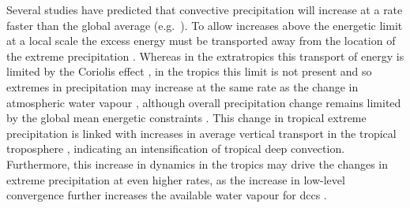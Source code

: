 Several studies have predicted that convective precipitation will increase at a rate faster than the global average (e.g.\ \citet{ogorman_physical_2009, muller_intensification_2011, ogorman_precipitation_2015, donat_more_2016}).
To allow increases above the energetic limit at a local scale the excess energy must be transported away from the location of the extreme precipitation \citep{muller_energetic_2011}.
Whereas in the extratropics this transport of energy is limited by the Coriolis effect \citep{ogorman_physical_2009}, in the tropics this limit is not present and so extremes in precipitation may increase at the same rate as the change in atmospheric water vapour \citep{ogorman_energetic_2012}, although overall precipitation change remains limited by the global mean energetic constraints \citep{allen_constraints_2002}.
This change in tropical extreme precipitation is linked with increases in average vertical transport in the tropical troposphere \citep{muller_energetic_2011}, indicating an intensification of tropical deep convection.
Furthermore, this increase in dynamics in the tropics may drive the changes in extreme precipitation at even higher rates, as the increase in low-level convergence further increases the available water vapour for \acrshort{dcc}s \citep{ogorman_energetic_2012}.

